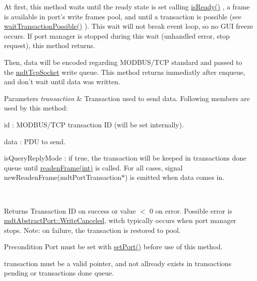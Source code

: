 At first, this method waits until the ready state is set calling \hyperlink{classmdt_modbus_tcp_port_manager_a5477eb7e8d57c5a42004046b426e39b6}{is\-Ready()} , a frame is available in port's write frames pool, and until a transaction is possible (see \hyperlink{classmdt_port_manager_ac04a12f8aa20ba04695083afce45a6cc}{wait\-Transaction\-Possible()} ). This wait will not break event loop, so no G\-U\-I freeze occurs. If port manager is stopped during this wait (unhandled error, stop request), this method returns.

Then, data will be encoded regarding M\-O\-D\-B\-U\-S/\-T\-C\-P standard and passed to the \hyperlink{classmdt_tcp_socket}{mdt\-Tcp\-Socket} write queue. This method returns immediatly after enqueue, and don't wait until data was written.


\begin{DoxyParams}{Parameters}
{\em transaction} & Transaction used to send data. Following members are used by this method\-:
\begin{DoxyItemize}
\item id \-: M\-O\-D\-B\-U\-S/\-T\-C\-P transaction I\-D (will be set internally).
\item data \-: P\-D\-U to send.
\item is\-Query\-Reply\-Mode \-: if true, the transaction will be keeped in transactions done queue until \hyperlink{classmdt_port_manager_a830ae182d06dd6a52c43a7f45b9240ac}{readen\-Frame(int)} is called. For all cases, signal new\-Readen\-Frame(mdt\-Port\-Transaction$\ast$) is emitted when data comes in.
\end{DoxyItemize}\\
\hline
\end{DoxyParams}
\begin{DoxyReturn}{Returns}
Transaction I\-D on success or value $<$ 0 on error. Possible error is \hyperlink{classmdt_abstract_port_ad4121bb930c95887e77f8bafa065a85eae50ff4a9393507ad39005ddc7d5be42f}{mdt\-Abstract\-Port\-::\-Write\-Canceled}, witch typically occurs when port manager stops. Note\-: on failure, the transaction is restored to pool. 
\end{DoxyReturn}
\begin{DoxyPrecond}{Precondition}
Port must be set with \hyperlink{classmdt_port_manager_afcd156b2d0c9d340999935efb6cd8cb6}{set\-Port()} before use of this method. 

transaction must be a valid pointer, and not allready exists in transactions pending or transactions done queue. 
\end{DoxyPrecond}


